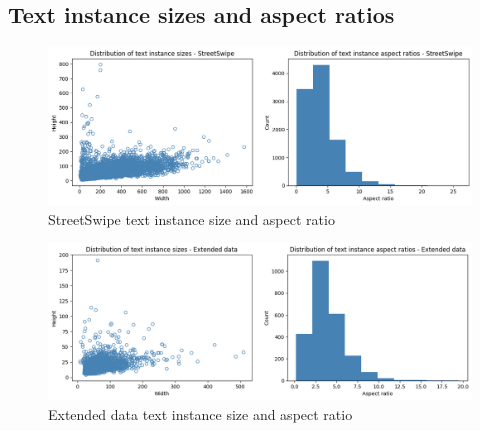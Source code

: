 \onecolumn

\appendix
\begin{appendices}

\section{Text instance sizes and aspect ratios}
\label{sec:apx:first_appendix}

\begin{figure}[H]
    \centering
    \includegraphics[width=\textwidth]{media/methodology/SS_ins_sz.png}
    \caption{StreetSwipe text instance size and aspect ratio}
    \label{fig:SS_ins_sz}
\end{figure}

\begin{figure}[H]
    \centering
    \includegraphics[width=\textwidth]{media/methodology/pano_ins_sz.png}
    \caption{Extended data text instance size and aspect ratio}
    \label{fig:pano_ins_sz}
\end{figure}

\end{appendices}
